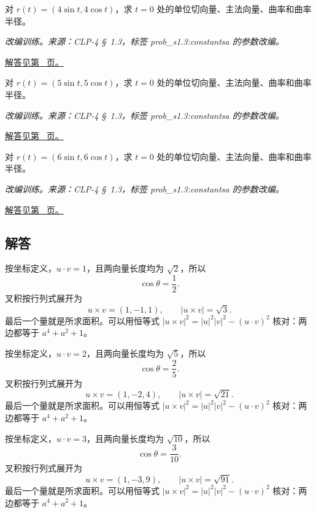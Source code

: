 \documentclass[UTF8,12pt,a4paper,fontset=fandol]{ctexart}
\begin{document}
\begin{example}[圆的定向切向与曲率]\label{ex:c31q22}
对 $r(t)=(4\sin t,4\cos t)$，求 $t=0$ 处的单位切向量、主法向量、曲率和曲率半径。
\par\textit{改编训练。来源：CLP-4 \S~1.3，标签 prob\_s1.3:constantsa 的参数改编。}\par\hyperref[ans:c31q22]{解答见第~\pageref{ans:c31q22} 页。}
\end{example}
\begin{example}[圆的定向切向与曲率]\label{ex:c31q23}
对 $r(t)=(5\sin t,5\cos t)$，求 $t=0$ 处的单位切向量、主法向量、曲率和曲率半径。
\par\textit{改编训练。来源：CLP-4 \S~1.3，标签 prob\_s1.3:constantsa 的参数改编。}\par\hyperref[ans:c31q23]{解答见第~\pageref{ans:c31q23} 页。}
\end{example}
\begin{example}[圆的定向切向与曲率]\label{ex:c31q24}
对 $r(t)=(6\sin t,6\cos t)$，求 $t=0$ 处的单位切向量、主法向量、曲率和曲率半径。
\par\textit{改编训练。来源：CLP-4 \S~1.3，标签 prob\_s1.3:constantsa 的参数改编。}\par\hyperref[ans:c31q24]{解答见第~\pageref{ans:c31q24} 页。}
\end{example}
\subsection{解答}
\begin{solve}\label{ans:c31q1}
按坐标定义，$u\cdot v=1$，且两向量长度均为 $\sqrt{2}$，所以
\[
\cos\theta=\frac{1}{2}.
\]
叉积按行列式展开为
\[
u\times v=(1,-1,1),\qquad |u\times v|=\sqrt{3}.
\]
最后一个量就是所求面积。可以用恒等式 $|u\times v|^2=|u|^2|v|^2-(u\cdot v)^2$ 核对：两边都等于 $a^4+a^2+1$。
\end{solve}

\begin{solve}\label{ans:c31q2}
按坐标定义，$u\cdot v=2$，且两向量长度均为 $\sqrt{5}$，所以
\[
\cos\theta=\frac{2}{5}.
\]
叉积按行列式展开为
\[
u\times v=(1,-2,4),\qquad |u\times v|=\sqrt{21}.
\]
最后一个量就是所求面积。可以用恒等式 $|u\times v|^2=|u|^2|v|^2-(u\cdot v)^2$ 核对：两边都等于 $a^4+a^2+1$。
\end{solve}

\begin{solve}\label{ans:c31q3}
按坐标定义，$u\cdot v=3$，且两向量长度均为 $\sqrt{10}$，所以
\[
\cos\theta=\frac{3}{10}.
\]
叉积按行列式展开为
\[
u\times v=(1,-3,9),\qquad |u\times v|=\sqrt{91}.
\]
最后一个量就是所求面积。可以用恒等式 $|u\times v|^2=|u|^2|v|^2-(u\cdot v)^2$ 核对：两边都等于 $a^4+a^2+1$。
\end{solve}
\end{document}

